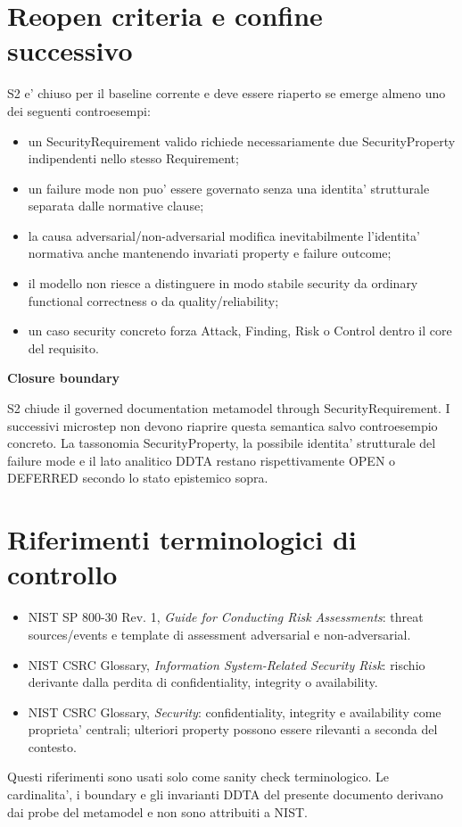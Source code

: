 \documentclass[11pt,a4paper]{article}
\newenvironment{statusbox}[1]{%
  \def\FrameCommand{\fcolorbox{ddtablue}{ddtagray}}%
  \MakeFramed{\advance\hsize-2\width\FrameRestore}
  \noindent\textbf{#1}\par\smallskip
}{\endMakeFramed}
\begin{document}
\section{Reopen criteria e confine successivo}

S2 e' chiuso per il baseline corrente e deve essere riaperto se emerge almeno uno dei seguenti controesempi:

\begin{itemize}
  \item un SecurityRequirement valido richiede necessariamente due SecurityProperty indipendenti nello stesso Requirement;
  \item un failure mode non puo' essere governato senza una identita' strutturale separata dalle normative clause;
  \item la causa adversarial/non-adversarial modifica inevitabilmente l'identita' normativa anche mantenendo invariati property e failure outcome;
  \item il modello non riesce a distinguere in modo stabile security da ordinary functional correctness o da quality/reliability;
  \item un caso security concreto forza Attack, Finding, Risk o Control dentro il core del requisito.
\end{itemize}

\begin{statusbox}{Closure boundary}
S2 chiude il governed documentation metamodel through SecurityRequirement. I successivi microstep non devono riaprire questa semantica salvo controesempio concreto. La tassonomia SecurityProperty, la possibile identita' strutturale del failure mode e il lato analitico DDTA restano rispettivamente OPEN o DEFERRED secondo lo stato epistemico sopra.
\end{statusbox}

\section{Riferimenti terminologici di controllo}

\begin{itemize}
  \item NIST SP 800-30 Rev. 1, \emph{Guide for Conducting Risk Assessments}: threat sources/events e template di assessment adversarial e non-adversarial.
  \item NIST CSRC Glossary, \emph{Information System-Related Security Risk}: rischio derivante dalla perdita di confidentiality, integrity o availability.
  \item NIST CSRC Glossary, \emph{Security}: confidentiality, integrity e availability come proprieta' centrali; ulteriori property possono essere rilevanti a seconda del contesto.
\end{itemize}

Questi riferimenti sono usati solo come sanity check terminologico. Le cardinalita', i boundary e gli invarianti DDTA del presente documento derivano dai probe del metamodel e non sono attribuiti a NIST.
\end{document}
